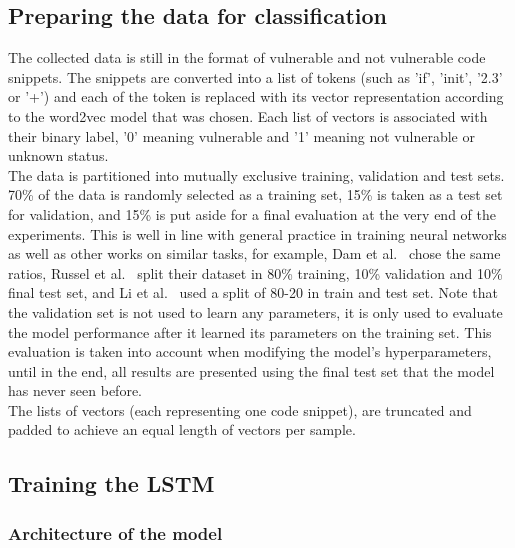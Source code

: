 \documentclass[
a4paper,
pagesize,
pdftex,
12pt,
ngerman,
fleqn,
final,
]{scrartcl}
\begin{document}
	\subsection{Preparing the data for classification}
	The collected data is still in the format of vulnerable and not vulnerable code snippets. The snippets are converted into a list of tokens (such as 'if', 'init', '2.3' or '+') and each of the token is replaced with its vector representation according to the word2vec model that was chosen. Each list of vectors is associated with their binary label, '0' meaning vulnerable and '1' meaning not vulnerable or unknown status.\\
	The data is partitioned into mutually exclusive training, validation and test sets. 70\% of the data is randomly selected as a training set, 15\% is taken as a test set for validation, and 15\% is put aside for a final evaluation at the very end of the experiments. This is well in line with general practice in training neural networks as well as other works on similar tasks, for example, Dam et al.~\cite{Dam.2016} chose the same ratios, Russel et al.~\cite{Russell.2018} split their dataset in 80\% training, 10\% validation and 10\% final test set, and Li et al.~\cite{Li.2018} used a split of 80-20 in train and test set. Note that the validation set is not used to learn any parameters, it is only used to evaluate the model performance after it learned its parameters on the training set. This evaluation is taken into account when modifying the model's hyperparameters, until in the end, all results are presented using the final test set that the model has never seen before.\\
	The lists of vectors (each representing one code snippet), are truncated and padded to achieve an equal length of vectors per sample.
	
	\subsection{Training the LSTM}
	
	\subsubsection{Architecture of the model}
	
\end{document}
